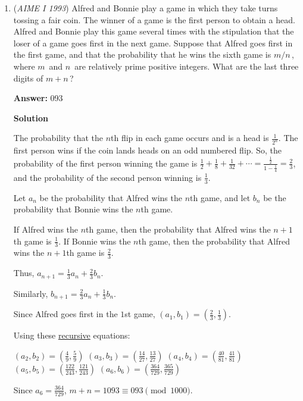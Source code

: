 \begin{enumerate}
 \textbf{Note} The solid described in this problem is an icosidodecahedron.

 


	\item (\textit{AIME I 1993}) Alfred and Bonnie play a game in which they take turns tossing a fair coin. The winner of a game is the first person to obtain a head. Alfred and Bonnie play this game several times with the stipulation that the loser of a game goes first in the next game. Suppose that Alfred goes first in the first game, and that the probability that he wins the sixth game is $m/n\,$, where $m\,$ and $n\,$ are relatively prime positive integers. What are the last three digits of $m+n\,$? 


 
 \textbf{Answer: }093



\textbf{Solution}

The probability that the $n$th flip in each game occurs and is a head is $\frac{1}{2^n}$. The first person wins if the coin lands heads on an odd numbered flip. So, the probability of the first person winning the game is $\frac{1}{2}+\frac{1}{8}+\frac{1}{32}+\cdots = \frac{\frac{1}{2}}{1-\frac{1}{4}}=\frac{2}{3}$, and the probability of the second person winning is $\frac{1}{3}$. 

 Let $a_n$ be the probability that Alfred wins the $n$th game, and let $b_n$ be the probability that Bonnie wins the $n$th game. 

 If Alfred wins the $n$th game, then the probability that Alfred wins the $n+1$th game is $\frac{1}{3}$. If Bonnie wins the $n$th game, then the probability that Alfred wins the $n+1$th game is $\frac{2}{3}$. 

 Thus, $a_{n+1}=\frac{1}{3}a_n+\frac{2}{3}b_n$. 

 Similarly, $b_{n+1}=\frac{2}{3}a_n+\frac{1}{3}b_n$. 

 Since Alfred goes first in the $1$st game, $(a_1,b_1)=\left(\frac{2}{3}, \frac{1}{3}\right)$. 

 Using these \href{https://artofproblemsolving.com/wiki/index.php?title=Recursion}{recursive} equations: 

 $(a_2,b_2)=\left(\frac{4}{9}, \frac{5}{9}\right)$
$(a_3,b_3)=\left(\frac{14}{27}, \frac{13}{27}\right)$
$(a_4,b_4)=\left(\frac{40}{81}, \frac{41}{81}\right)$
$(a_5,b_5)=\left(\frac{122}{243}, \frac{121}{243}\right)$
$(a_6,b_6)=\left(\frac{364}{729}, \frac{365}{729}\right)$ 

 Since $a_6=\frac{364}{729}$, $m+n = 1093 \equiv \boxed{093} \pmod{1000}$.


\end{enumerate}
